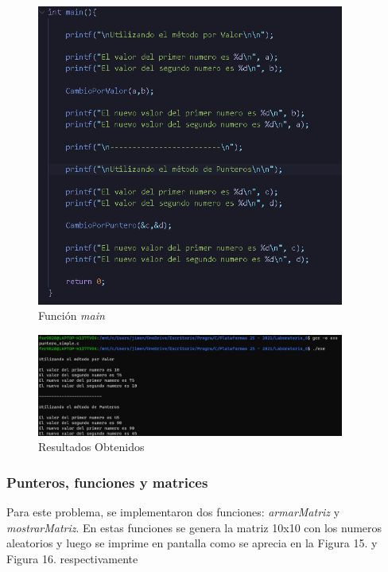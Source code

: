 \documentclass[12pt,a4paper]{article}
\begin{document}
\begin{figure}[H]
    \centering
    \center
    \includegraphics[width=0.9\textwidth]{Fotos_Lab6/Funcion_main.png}
    \caption{Función \textit{main}}
    \label{1}
\end{figure}

\begin{figure}[H]
    \centering
    \center
    \includegraphics[width=0.9\textwidth]{Fotos_Lab6/Resultado1.png}
    \caption{Resultados Obtenidos}
    \label{1}
\end{figure}

\subsubsection{Punteros, funciones y matrices}

Para este problema, se implementaron dos funciones: \textit{armarMatriz} y \textit{mostrarMatriz}. En estas funciones se genera la matriz 10x10 con los numeros aleatorios y luego se imprime en pantalla como se aprecia en la Figura 15. y Figura 16. respectivamente
\end{document}
